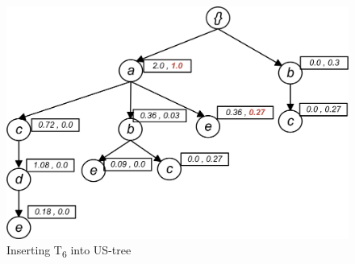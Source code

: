 \begin{figure}
  \centering
	\includegraphics[width=.6\textwidth]{images/sim_06.jpg}  
	\caption{Inserting T\textsubscript{6} into US-tree}
	\label{figure:t6}
\end{figure}

%